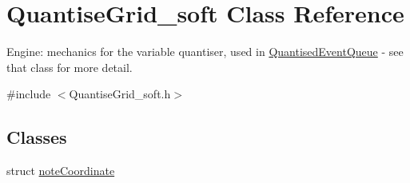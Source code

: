 \hypertarget{classQuantiseGrid__soft}{}\section{Quantise\+Grid\+\_\+soft Class Reference}
\label{classQuantiseGrid__soft}


Engine\+: mechanics for the variable quantiser, used in \hyperlink{classQuantisedEventQueue}{Quantised\+Event\+Queue} -\/ see that class for more detail.  




{\ttfamily \#include $<$Quantise\+Grid\+\_\+soft.\+h$>$}

\subsection*{Classes}
\begin{DoxyCompactItemize}
\item 
struct \hyperlink{structQuantiseGrid__soft_1_1noteCoordinate}{note\+Coordinate}
\end{DoxyCompactItemize}
